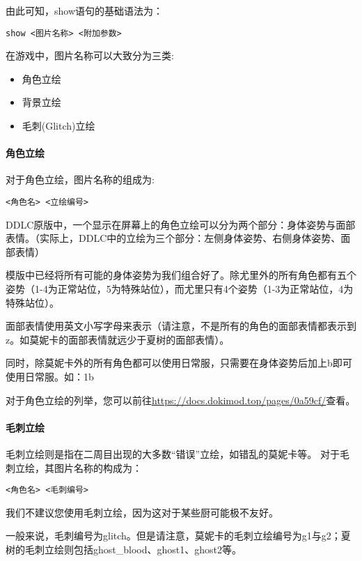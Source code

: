 由此可知，show语句的基础语法为：
\begin{lstlisting}[numbers=none]
show <图片名称> <附加参数>
\end{lstlisting}

在游戏中，图片名称可以大致分为三类:
\begin{itemize}
    \item 角色立绘
    \item 背景立绘
    \item 毛刺(Glitch)立绘
\end{itemize}

\paragraph{角色立绘}\label{par:3.2.1}

对于角色立绘，图片名称的组成为:
\begin{lstlisting}[numbers=none]
<角色名> <立绘编号>
\end{lstlisting}

DDLC原版中，一个显示在屏幕上的角色立绘可以分为两个部分：身体姿势与面部表情。（实际上，DDLC中的立绘为三个部分：左侧身体姿势、右侧身体姿势、面部表情）

模版中已经将所有可能的身体姿势为我们组合好了。除尤里外的所有角色都有五个姿势（1-4为正常站位，5为特殊站位），而尤里只有4个姿势（1-3为正常站位，4为特殊站位）。

面部表情使用英文小写字母来表示（请注意，不是所有的角色的面部表情都表示到z。如莫妮卡的面部表情就远少于夏树的面部表情）。

同时，除莫妮卡外的所有角色都可以使用日常服，只需要在身体姿势后加上b即可使用日常服。如：1b

对于角色立绘的列举，您可以前往\url{https://docs.dokimod.top/pages/0a59cf/}查看。

\paragraph{毛刺立绘}

毛刺立绘则是指在二周目出现的大多数“错误”立绘，如错乱的莫妮卡等。
对于毛刺立绘，其图片名称的构成为：
\begin{lstlisting}[numbers=none]
<角色名> <毛刺编号>
\end{lstlisting}

\begin{Warning}
    我们不建议您使用毛刺立绘，因为这对于某些厨可能极不友好。
\end{Warning}

一般来说，毛刺编号为glitch。但是请注意，莫妮卡的毛刺立绘编号为g1与g2；夏树的毛刺立绘则包括ghost\_blood、ghost1、ghost2等。

